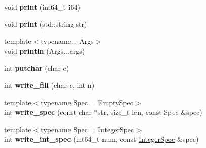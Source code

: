 \begin{DoxyCompactItemize}
\item 
void {\bfseries print} (int64\+\_\+t i64)\hypertarget{classgxx_1_1io_1_1format__writer_ac8e4b083a41ac2a6efe20c439d46f42d}{}\label{classgxx_1_1io_1_1format__writer_ac8e4b083a41ac2a6efe20c439d46f42d}

\item 
void {\bfseries print} (std\+::string str)\hypertarget{classgxx_1_1io_1_1format__writer_a6cf311ce55a9940752f5aa32f5ecf980}{}\label{classgxx_1_1io_1_1format__writer_a6cf311ce55a9940752f5aa32f5ecf980}

\item 
{\footnotesize template$<$typename... Args$>$ }\\void {\bfseries println} (Args...\+args)\hypertarget{classgxx_1_1io_1_1format__writer_abc83ba815281c94ec2a5c9cd9550de3b}{}\label{classgxx_1_1io_1_1format__writer_abc83ba815281c94ec2a5c9cd9550de3b}

\item 
int {\bfseries putchar} (char c)\hypertarget{classgxx_1_1io_1_1format__writer_a4e4b84faa244ee84f84f9c0bf8107912}{}\label{classgxx_1_1io_1_1format__writer_a4e4b84faa244ee84f84f9c0bf8107912}

\item 
int {\bfseries write\+\_\+fill} (char c, int n)\hypertarget{classgxx_1_1io_1_1format__writer_a926d75097a61a778c425089993efb5f9}{}\label{classgxx_1_1io_1_1format__writer_a926d75097a61a778c425089993efb5f9}

\item 
{\footnotesize template$<$typename Spec  = Empty\+Spec$>$ }\\int {\bfseries write\+\_\+spec} (const char $\ast$str, size\+\_\+t len, const Spec \&spec)\hypertarget{classgxx_1_1io_1_1format__writer_a0a6b5523382a408f3e8a281f42fd9c1f}{}\label{classgxx_1_1io_1_1format__writer_a0a6b5523382a408f3e8a281f42fd9c1f}

\item 
{\footnotesize template$<$typename Spec  = Integer\+Spec$>$ }\\int {\bfseries write\+\_\+int\+\_\+spec} (int64\+\_\+t num, const \hyperlink{classgxx_1_1io_1_1IntegerSpec}{Integer\+Spec} \&spec)\hypertarget{classgxx_1_1io_1_1format__writer_ad142c2af00de5de8420250bedc2ae445}{}\label{classgxx_1_1io_1_1format__writer_ad142c2af00de5de8420250bedc2ae445}

\end{DoxyCompactItemize}
